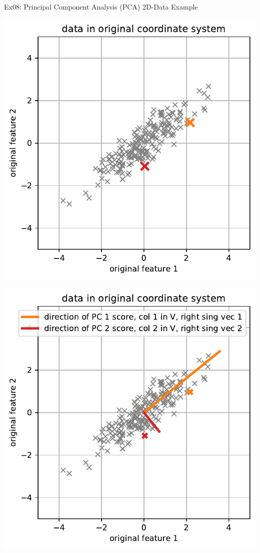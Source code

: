 \documentclass[mathserif, aspectratio=1610]{intbeamer}
\begin{document}
\begin{frame}[t]{Ex08: Principal Component Analysis (PCA) 2D-Data Example}
\begin{minipage}[t]{0.49\textwidth}
\includegraphics[width=\textwidth]{pca_2d_original_data.pdf}
\end{minipage}
%
\begin{minipage}[t]{0.49\textwidth}
\includegraphics[width=\textwidth]{pca_2d_original_data_with_pcdir.pdf}
\end{minipage}
\end{frame}
\end{document}
